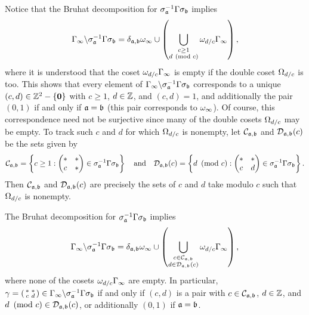     Notice that the Bruhat decomposition for $\sigma_{\mathfrak{a}}^{-1}\Gamma\sigma_{\mathfrak{b}}$ implies
    \[
      \Gamma_{\infty}\backslash\sigma_{\mathfrak{a}}^{-1}\Gamma\sigma_{\mathfrak{b}} = \delta_{\mathfrak{a},\mathfrak{b}}\omega_{\infty} \cup \left(\bigcup_{\substack{c \ge 1 \\ d \ \left(\text{mod }c\right)}}\omega_{d/c}\Gamma_{\infty}\right),
    \]
    where it is understood that the coset $\omega_{d/c}\Gamma_{\infty}$ is empty if the double coset $\Omega_{d/c}$ is too. This shows that every element of $\Gamma_{\infty}\backslash\sigma_{\mathfrak{a}}^{-1}\Gamma\sigma_{\mathfrak{b}}$ corresponds to a unique $(c,d) \in \mathbb{Z}^{2}-\{\mathbf{0}\}$ with $c \ge 1$, $d \in \mathbb{Z}$, and $(c,d) = 1$, and additionally the pair $(0,1)$ if and only if $\mathfrak{a} = \mathfrak{b}$ (this pair corresponds to $\omega_{\infty}$). Of course, this correspondence need not be surjective since many of the double cosets $\Omega_{d/c}$ may be empty. To track such $c$ and $d$ for which $\Omega_{d/c}$ is nonempty, let $\mathcal{C}_{\mathfrak{a},\mathfrak{b}}$ and $\mathcal{D}_{\mathfrak{a},\mathfrak{b}}(c)$ be the sets given by
    \[
      \mathcal{C}_{\mathfrak{a},\mathfrak{b}} = \left\{c \ge 1: \begin{pmatrix} \ast & \ast \\ c & \ast \end{pmatrix} \in \sigma_{\mathfrak{a}}^{-1}\Gamma\sigma_{\mathfrak{b}}\right\} \quad \text{and} \quad \mathcal{D}_{\mathfrak{a},\mathfrak{b}}(c) = \left\{d \ \left(\text{mod }c\right): \begin{pmatrix} \ast & \ast \\ c & d \end{pmatrix} \in \sigma_{\mathfrak{a}}^{-1}\Gamma\sigma_{\mathfrak{b}}\right\}.
    \]
    Then $\mathcal{C}_{\mathfrak{a},\mathfrak{b}}$ and $\mathcal{D}_{\mathfrak{a},\mathfrak{b}}(c)$ are precisely the sets of $c$ and $d$ take modulo $c$ such that $\Omega_{d/c}$ is nonempty.

    \begin{remark}\label{rem:Bruhat_modulo_infity_exact}
      The Bruhat decomposition for $\sigma_{\mathfrak{a}}^{-1}\Gamma\sigma_{\mathfrak{b}}$ implies
      \[
        \Gamma_{\infty}\backslash\sigma_{\mathfrak{a}}^{-1}\Gamma\sigma_{\mathfrak{b}} = \delta_{\mathfrak{a},\mathfrak{b}}\omega_{\infty} \cup \left(\bigcup_{\substack{c \in \mathcal{C}_{\mathfrak{a},\mathfrak{b}} \\ d \in \mathcal{D}_{\mathfrak{a},\mathfrak{b}}(c)}}\omega_{d/c}\Gamma_{\infty}\right),
      \]
      where none of the cosets $\omega_{d/c}\Gamma_{\infty}$ are empty. In particular, $\gamma = \begin{psmallmatrix} \ast & \ast \\ c & d \end{psmallmatrix} \in \Gamma_{\infty}\backslash\sigma_{\mathfrak{a}}^{-1}\Gamma\sigma_{\mathfrak{b}}$ if and only if $(c,d)$ is a pair with $c \in \mathcal{C}_{\mathfrak{a},\mathfrak{b}}$, $d \in \mathbb{Z}$, and $d \ \left(\text{mod }c\right) \in \mathcal{D}_{\mathfrak{a},\mathfrak{b}}(c)$, or additionally $(0,1)$ if $\mathfrak{a} = \mathfrak{b}$.
    \end{remark}
    
